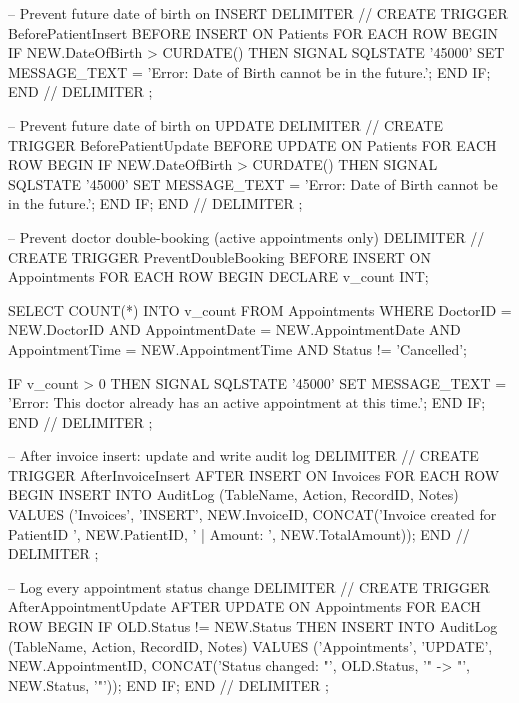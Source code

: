 \begin{sqlcode}
-- Prevent future date of birth on INSERT
DELIMITER //
CREATE TRIGGER BeforePatientInsert
BEFORE INSERT ON Patients
FOR EACH ROW
BEGIN
    IF NEW.DateOfBirth > CURDATE() THEN
        SIGNAL SQLSTATE '45000'
            SET MESSAGE_TEXT = 'Error: Date of Birth cannot be in the future.';
    END IF;
END //
DELIMITER ;

-- Prevent future date of birth on UPDATE
DELIMITER //
CREATE TRIGGER BeforePatientUpdate
BEFORE UPDATE ON Patients
FOR EACH ROW
BEGIN
    IF NEW.DateOfBirth > CURDATE() THEN
        SIGNAL SQLSTATE '45000'
            SET MESSAGE_TEXT = 'Error: Date of Birth cannot be in the future.';
    END IF;
END //
DELIMITER ;

-- Prevent doctor double-booking (active appointments only)
DELIMITER //
CREATE TRIGGER PreventDoubleBooking
BEFORE INSERT ON Appointments
FOR EACH ROW
BEGIN
    DECLARE v_count INT;

    SELECT COUNT(*) INTO v_count
    FROM Appointments
    WHERE DoctorID = NEW.DoctorID
      AND AppointmentDate = NEW.AppointmentDate
      AND AppointmentTime = NEW.AppointmentTime
      AND Status != 'Cancelled';

    IF v_count > 0 THEN
        SIGNAL SQLSTATE '45000'
            SET MESSAGE_TEXT = 'Error: This doctor already has an active appointment at this time.';
    END IF;
END //
DELIMITER ;

-- After invoice insert: update and write audit log
DELIMITER //
CREATE TRIGGER AfterInvoiceInsert
AFTER INSERT ON Invoices
FOR EACH ROW
BEGIN
    INSERT INTO AuditLog (TableName, Action, RecordID, Notes)
    VALUES ('Invoices', 'INSERT', NEW.InvoiceID,
            CONCAT('Invoice created for PatientID ', NEW.PatientID,
                   ' | Amount: ', NEW.TotalAmount));
END //
DELIMITER ;

-- Log every appointment status change
DELIMITER //
CREATE TRIGGER AfterAppointmentUpdate
AFTER UPDATE ON Appointments
FOR EACH ROW
BEGIN
    IF OLD.Status != NEW.Status THEN
        INSERT INTO AuditLog (TableName, Action, RecordID, Notes)
        VALUES ('Appointments', 'UPDATE', NEW.AppointmentID,
                CONCAT('Status changed: "', OLD.Status, '" -> "', NEW.Status, '"'));
    END IF;
END //
DELIMITER ;
\end{sqlcode}

